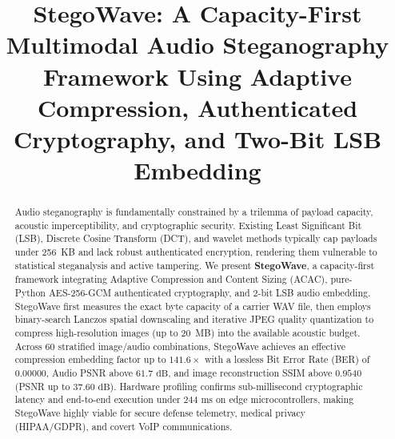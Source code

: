 \documentclass[10pt,conference]{IEEEtran}
\begin{document}
\title{StegoWave: A Capacity-First Multimodal Audio Steganography Framework Using Adaptive Compression, Authenticated Cryptography, and Two-Bit LSB Embedding}

\author{
\and
{}
}

\maketitle

\begin{abstract}
Audio steganography is fundamentally constrained by a trilemma of payload capacity, acoustic imperceptibility, and cryptographic security. Existing Least Significant Bit (LSB), Discrete Cosine Transform (DCT), and wavelet methods typically cap payloads under 256~KB and lack robust authenticated encryption, rendering them vulnerable to statistical steganalysis and active tampering. We present \textbf{StegoWave}, a capacity-first framework integrating Adaptive Compression and Content Sizing (ACAC), pure-Python AES-256-GCM authenticated cryptography, and 2-bit LSB audio embedding. StegoWave first measures the exact byte capacity of a carrier WAV file, then employs binary-search Lanczos spatial downscaling and iterative JPEG quality quantization to compress high-resolution images (up to 20~MB) into the available acoustic budget. Across 60 stratified image/audio combinations, StegoWave achieves an effective compression embedding factor up to $141.6\times$ with a lossless Bit Error Rate (BER) of $0.00000$, Audio PSNR above $61.7\text{ dB}$, and image reconstruction SSIM above $0.9540$ (PSNR up to $37.60\text{ dB}$). Hardware profiling confirms sub-millisecond cryptographic latency and end-to-end execution under $244\text{ ms}$ on edge microcontrollers, making StegoWave highly viable for secure defense telemetry, medical privacy (HIPAA/GDPR), and covert VoIP communications.
\end{abstract}
\end{document}
